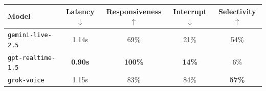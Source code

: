 \begin{tabular}{@{}lcccc@{}}
\toprule
{\textbf{Model}} & \textbf{Latency}$\downarrow$ & \textbf{Responsiveness}$\uparrow$ & \textbf{Interrupt}$\downarrow$ & \textbf{Selectivity}$\uparrow$ \\
\midrule
{\texttt{gemini-live-2.5}} & 1.14s & 69\% & 21\% & 54\% \\
{\texttt{gpt-realtime-1.5}} & \textbf{0.90s} & \textbf{100\%} & \textbf{14\%} & 6\% \\
{\texttt{grok-voice}} & 1.15s & 83\% & 84\% & \textbf{57\%} \\
\bottomrule
\end{tabular}